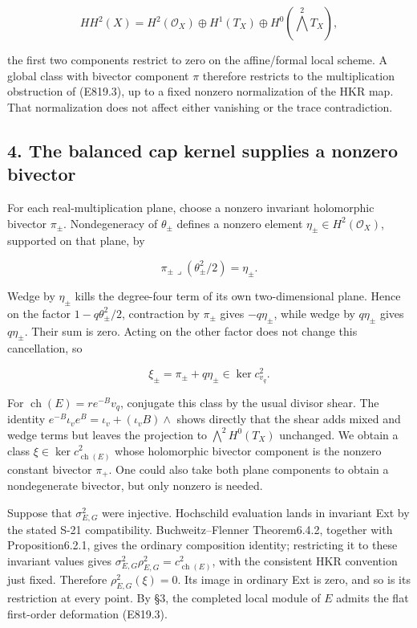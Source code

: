 \[
 HH^2(X)=H^2(\mathcal O_X)\oplus H^1(T_X)
                \oplus H^0(\bigwedge^2T_X),
 \tag{E819.12}
\]

the first two components restrict to zero on the affine/formal local
scheme. A global class with bivector component \(\pi\) therefore
restricts to the multiplication obstruction of (E819.3), up to a fixed
nonzero normalization of the HKR map. That normalization does not affect
either vanishing or the trace contradiction.

\subsection{4. The balanced cap kernel supplies a nonzero
bivector}\label{SF-E819-the-balanced-cap-kernel-supplies-a-nonzero-bivector}

For each real-multiplication plane, choose a nonzero invariant
holomorphic bivector \(\pi_\pm\). Nondegeneracy of \(\theta_\pm\)
defines a nonzero element \(\eta_\pm\in H^2(\mathcal O_X)\), supported
on that plane, by

\[
 \pi_\pm\mathbin{\lrcorner}(\theta_\pm^2/2)=\eta_\pm.
\]

Wedge by \(\eta_\pm\) kills the degree-four term of its own
two-dimensional plane. Hence on the factor \(1-q\theta_\pm^2/2\),
contraction by \(\pi_\pm\) gives \(-q\eta_\pm\), while wedge by
\(q\eta_\pm\) gives \(q\eta_\pm\). Their sum is zero. Acting on the
other factor does not change this cancellation, so

\[
 \xi_\pm=\pi_\pm+q\eta_\pm
       \in\ker c^2_{v_q}.
 \tag{E819.13}
\]

For \(\operatorname{ch}(E)=r e^{-B}v_q\), conjugate this class by the
usual divisor shear. The identity
\(e^{-B}\iota_v e^B=\iota_v+(\iota_vB)\wedge\) shows directly that the
shear adds mixed and wedge terms but leaves the projection to
\(\bigwedge^2H^0(T_X)\) unchanged. We obtain a class
\(\xi\in\ker c^2_{\operatorname{ch}(E)}\) whose holomorphic bivector
component is the nonzero constant bivector \(\pi_+\). One could also
take both plane components to obtain a nondegenerate bivector, but only
nonzero is needed.

Suppose that \(\sigma^2_{E,G}\) were injective. Hochschild evaluation
lands in invariant Ext by the stated S-21 compatibility.
Buchweitz--Flenner Theorem6.4.2, together with Proposition6.2.1, gives
the ordinary composition identity; restricting it to these invariant
values gives \(\sigma^2_{E,G}\rho^2_{E,G}=c^2_{\operatorname{ch}(E)}\),
with the consistent HKR convention just fixed. Therefore
\(\rho^2_{E,G}(\xi)=0\). Its image in ordinary Ext is zero, and so is
its restriction at every point. By §3, the completed local module of
\(E\) admits the flat first-order deformation (E819.3).

